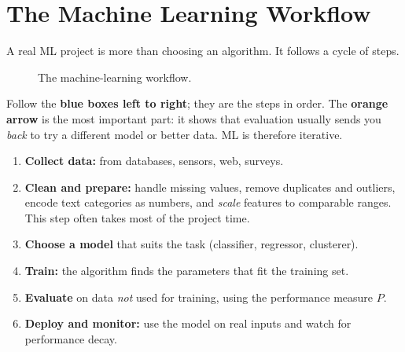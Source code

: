 \section{The Machine Learning Workflow}

A real ML project is more than choosing an algorithm. It follows a cycle of steps.

\begin{figure}[!htbp]
\centering
{}
\caption{The machine-learning workflow.}\label{fig:workflow}
\end{figure}

\begin{explain}
Follow the \textbf{blue boxes left to right}; they are the steps in order. The \textbf{orange arrow} is the most important part: it shows that evaluation usually sends you \emph{back} to try a different model or better data. ML is therefore iterative.
\end{explain}

\begin{enumerate}
  \item \textbf{Collect data:} from databases, sensors, web, surveys.
  \item \textbf{Clean and prepare:} handle missing values, remove duplicates and outliers, encode text categories as numbers, and \emph{scale} features to comparable ranges. This step often takes most of the project time.
  \item \textbf{Choose a model} that suits the task (classifier, regressor, clusterer).
  \item \textbf{Train:} the algorithm finds the parameters that fit the training set.
  \item \textbf{Evaluate} on data \emph{not} used for training, using the performance measure $P$.
  \item \textbf{Deploy and monitor:} use the model on real inputs and watch for performance decay.
\end{enumerate}

